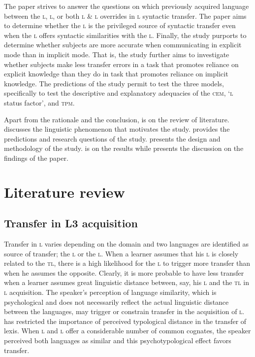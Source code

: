 \documentclass[output=paper,
modfonts
]{langscibook}
\begin{document}
The paper strives to answer the questions on which previously acquired language between the \textsc{l}, \textsc{l}, or both \textsc{l} \& \textsc{l} overrides in \textsc{l} syntactic transfer. The paper aims to determine whether the \textsc{l} is the privileged source of syntactic transfer even when the \textsc{l} offers syntactic similarities with the \textsc{l}. Finally, the study purports to determine whether subjects are more accurate when communicating in explicit mode than in implicit mode. That is, the study further aims to investigate whether subjects make less transfer errors in a task that promotes reliance on explicit knowledge than they do in task that promotes reliance on implicit knowledge. The predictions of the study permit to test the three models, specifically to test the descriptive and explanatory adequacies of the \textsc{cem}, ‘\textsc{l} status factor’, and \textsc{tpm}. 

Apart from the rationale and the conclusion,  is on the review of literature.  discusses the linguistic phenomenon that motivates the study.  provides the predictions and research questions of the study.  presents the design and methodology of the study.  is on the results while  presents the discussion on the findings of the paper.

\section{Literature review}\label{sec:kabasele:2}
\subsection{Transfer in L3 acquisition}

Transfer in \textsc{l} varies depending on the domain and two languages are identified as source of transfer; the \textsc{l} or the \textsc{l}. When a learner assumes that his \textsc{l} is closely related to the \textsc{tl}, there is a high likelihood for the \textsc{l} to trigger more transfer than when he assumes the opposite. Clearly, it is more probable to have less transfer when a learner assumes great linguistic distance between, say, his \textsc{l} and the \textsc{tl} in \textsc{l} acquisition. The speaker’s perception of language similarity, which is psychological and does not necessarily reflect the actual linguistic distance between the languages, may trigger or constrain transfer in the acquisition of \textsc{l}. \citet{Ringbom2003} has restricted the importance of perceived typological distance in the transfer of lexis. When \textsc{l} and \textsc{l} offer a considerable number of common cognates, the speaker perceived both languages as similar and this psychotypological effect favors transfer.
\end{document}
